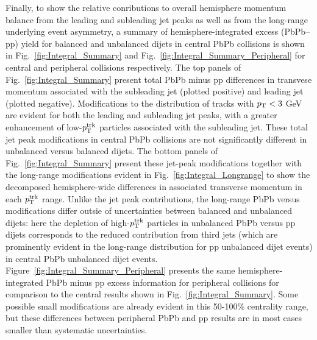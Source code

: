 Finally, to show the relative conributions to overall hemisphere momentum balance from the leading and subleading jet peaks as well as from the long-range underlying event asymmetry, a summary of hemisphere-integrated excess (PbPb--pp) yield for balanced and unbalanced dijets in central PbPb collisions is shown in Fig.~\ref{fig:Integral_Summary} and Fig.~\ref{fig:Integral_Summary_Peripheral} for central and peripheral collisions respectively.  The top panels of Fig.~\ref{fig:Integral_Summary} present total PbPb minus pp differences in transvese momentum associated with the subleading jet (plotted positive) and leading jet (plotted negative).  Modifications to the distribution of tracks with $p_{\rm T}< 3$ GeV are evident for both the leading and subleading jet peaks, with a greater enhancement of low-$p_{\rm T}^{\rm trk}$ particles associated with the subleading jet.   These total jet peak modifications in central PbPb collisions are not significantly different in unbalanced versus balanced dijets.  The bottom panels of Fig.~\ref{fig:Integral_Summary} present these jet-peak modifications together with the long-range modifications evident in Fig.~\ref{fig:Integral_Longrange} to show the decomposed hemisphere-wide differences in associated transverse momentum in each $p_{\rm T}^{\rm trk}$ range.  Unlike the jet peak contributions, the long-range PbPb versus modifications differ outsie of uncertainties between balanced and unbalanced dijets:  here the depletion of high-$p_{\rm T}^{\rm trk}$ particles in unbalanced PbPb versus pp dijets corresponds to the reduced contribution from third jets (which are prominently evident in the long-range distribution for pp unbalanced dijet events) in central PbPb unbalanced dijet events.  Figure~\ref{fig:Integral_Summary_Peripheral} presents the same hemisphere-integrated PbPb minus pp excess information for peripheral collisions for comparison to the central results shown in Fig.~\ref{fig:Integral_Summary}.  Some possible small modifications are already evident in this 50-100\% centrality range, but these differences between peripheral PbPb and pp results are in most cases smaller than systematic uncertainties.


